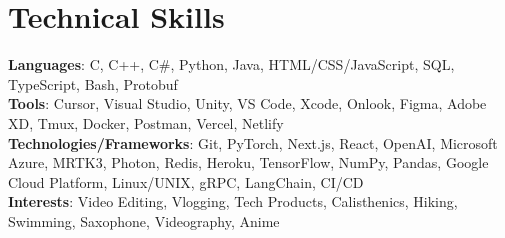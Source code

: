\documentclass[letterpaper,11pt]{article}
\begin{document}
\section{Technical Skills}

    \vspace{-7pt}
    \begin{itemize}
    [leftmargin=0.15in, label={}]\small{\item{
        \textbf{Languages}{: C, C++, C\#, Python, Java, HTML/CSS/JavaScript, SQL, TypeScript, Bash, Protobuf} \\
        \textbf{Tools}{: Cursor, Visual Studio, Unity, VS Code, Xcode, Onlook, Figma, Adobe XD, Tmux, Docker, Postman, Vercel, Netlify } \\
        \textbf{Technologies/Frameworks}{: Git, PyTorch, Next.js, React, OpenAI, Microsoft Azure, MRTK3, Photon, Redis, Heroku, TensorFlow, NumPy, Pandas, Google Cloud Platform, Linux/UNIX, gRPC, LangChain, CI/CD} \\
        \textbf{Interests}{: Video Editing, Vlogging, Tech Products, Calisthenics, Hiking, Swimming, Saxophone, Videography, Anime} \\}}
    \end{itemize}
\end{document}
